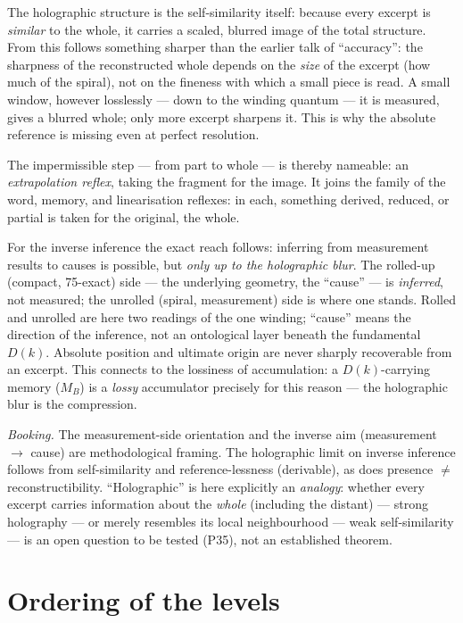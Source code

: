 The holographic structure is the self-similarity itself: because every excerpt is
\emph{similar} to the whole, it carries a scaled, blurred image of the total structure. From
this follows something sharper than the earlier talk of \enquote{accuracy}: the sharpness of
the reconstructed whole depends on the \emph{size} of the excerpt (how much of the spiral), not
on the fineness with which a small piece is read. A small window, however losslessly --- down
to the winding quantum --- it is measured, gives a blurred whole; only more excerpt sharpens
it. This is why the absolute reference is missing even at perfect resolution.

The impermissible step --- from part to whole --- is thereby nameable: an \emph{extrapolation
reflex}, taking the fragment for the image. It joins the family of the word, memory, and
linearisation reflexes: in each, something derived, reduced, or partial is taken for the
original, the whole.

For the inverse inference the exact reach follows: inferring from measurement results to causes
is possible, but \emph{only up to the holographic blur}. The rolled-up (compact, 75-exact) side
--- the underlying geometry, the \enquote{cause} --- is \emph{inferred}, not measured; the
unrolled (spiral, measurement) side is where one stands. Rolled and unrolled are here two
readings of the one winding; \enquote{cause} means the direction of the inference, not an
ontological layer beneath the fundamental $D(k)$. Absolute position and ultimate origin
are never sharply recoverable from an excerpt. This connects to the lossiness of accumulation: a
$D(k)$-carrying memory ($M_B$) is a \emph{lossy} accumulator precisely for this reason --- the
holographic blur is the compression.

\emph{Booking.} The measurement-side orientation and the inverse aim (measurement $\to$ cause)
are methodological framing. The holographic limit on inverse inference follows from
self-similarity and reference-lessness (derivable), as does presence $\neq$ reconstructibility.
\enquote{Holographic} is here explicitly an \emph{analogy}: whether every excerpt carries
information about the \emph{whole} (including the distant) --- strong holography --- or merely
resembles its local neighbourhood --- weak self-similarity --- is an open question to be tested
(P35), not an established theorem.

\section{Ordering of the levels}

